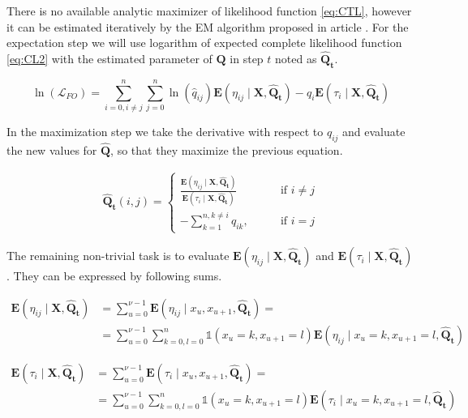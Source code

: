 \documentclass[thesis=M,english]{FITthesis}[2012/10/20]
\newcommand{\matr}[1]{\mathbf{#1}}
\begin{document}
There is no available analytic maximizer of likelihood function \eqref{eq:CTL}, however it can be estimated iteratively by the EM algorithm proposed in article \cite{Me07}.  
For the expectation step we will use logarithm of expected complete likelihood function \eqref{eq:CL2} with the estimated parameter of $\matr{Q}$ in step $t$ noted as $\matr{ \hat Q_t } $.

\begin{equation}\label{eq:EMCL}
 \ln( \mathcal{L}_{FO} ) = \sum_{i=0, i \neq j}^n \sum_{j=0}^{n} \ln( \hat q_{ij}) \mathbf{E}( \eta_{ij} \mid \matr{X}, \matr{ \hat Q_t } ) - \hat q_i \mathbf{E}( \tau_i \mid \matr{X}, \matr{ \hat Q_t } )
\end{equation}

In the maximization step we take the derivative with respect to $q_{ij}$ and evaluate the new values for $\matr{ \hat Q }$, so that they maximize the previous equation. 

\begin{equation}\label{eq:Qmax}
\begin{aligned}  
\matr{ \hat Q_t }(i,j)= 
\begin{cases}
\frac{ \mathbf{E}(\eta_{ij} \mid \matr{X}, \matr{ \hat Q_t } )}{ \mathbf{E}( \tau_i \mid \matr{X}, \matr{\hat Q_t} ) } & \text{if } i\neq j\\
- \sum\limits_{k=1}^{n,k \neq i} q_{ik}, \qquad & \text{if } i=j
\end{cases}
\end{aligned}
\end{equation}

The remaining non-trivial task is to evaluate $\mathbf{E}( \eta_{ij} \mid \matr{X}, \matr{\hat Q_t} )$ and $\mathbf{E}( \tau_i \mid \matr{X}, \matr{ \hat Q_t } )$. They can be expressed by following sums.


\begin{equation}
\begin{aligned}  
\mathbf{E}(\eta_{ij} \mid \matr{X}, \matr{\hat Q_t} ) &= \sum_{u=0}^{\nu-1} \mathbf{E}(\eta_{ij} \mid x_u, x_{u+1}, \matr{ \hat Q_t } ) = \\
&= \sum_{u=0}^{\nu-1} \sum_{k=0,l=0}^{n} \mathds{1}( x_u = k, x_{u+1} = l ) \mathbf{E}(\eta_{ij} \mid x_u = k, x_{u+1} = l, \matr{\hat Q_t} )
\end{aligned}
\end{equation}


\begin{equation}
\begin{aligned}  
\mathbf{E}( \tau_i \mid \matr{X}, \matr{\hat Q_t} ) &= \sum_{u=0}^{\nu-1} \mathbf{E}(\tau_i \mid x_u, x_{u+1}, \matr{ \hat Q_t } ) = \\
&= \sum_{u=0}^{\nu-1} \sum_{k=0,l=0}^{n} \mathds{1}( x_u = k, x_{u+1} = l ) \mathbf{E}(\tau_i \mid x_u = k, x_{u+1} = l, \matr{\hat Q_t} )
\end{aligned}
\end{equation}
   
\end{document}
